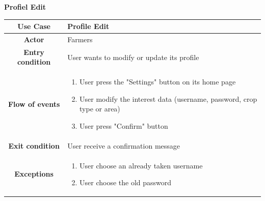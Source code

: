 \documentclass[table, 12pt]{article}
\begin{document}
\begin{itemize}
            
            \begin{table}[H]
                \item[] \textbf{Profiel Edit}
                \item[] 
                \centering
                \begin{tabular}{c m{}}
                    \hline
                    \textbf{Use Case} & Profile Edit\\ \hline
                    \textbf{Actor} & Farmers\\ \hline
                    \textbf{Entry condition} & User wants to modify or update its profile\\  \hline
                    \textbf{Flow of events} & \begin{enumerate}
                                                \item User press the "Settings" button on its home page
                                                \item User modify the interest data (username, password, crop type or area)
                                                \item User press "Confirm" button
                                            \end{enumerate}\\ \hline
                    \textbf{Exit condition} & User receive a confirmation message\\ \hline
                    \textbf{Exceptions} &  \begin{enumerate}
                        \item User choose an already taken username
                        \item User choose the old password
                    \end{enumerate}\\ \hline                    
                \end{tabular}
            \end{table}


\end{itemize}
\end{document}
